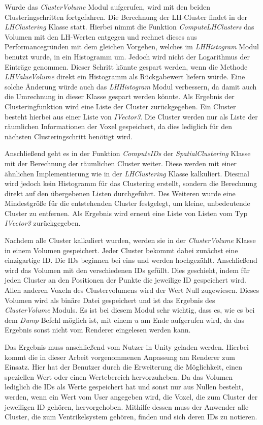 Wurde das \textit{ClusterVolume} Modul aufgerufen, wird mit den beiden Clusteringschritten fortgefahren. Die Berechnung der LH-Cluster findet in der \textit{LHClustering} Klasse statt. Hierbei nimmt die Funktion \textit{ComputeLHClusters} das Volumen mit den LH-Werten entgegen und rechnet dieses aus Performancegründen mit dem gleichen Vorgehen, welches im \textit{LHHistogram} Modul benutzt wurde, in ein Histogramm um. Jedoch wird nicht der Logarithmus der Einträge genommen. Dieser Schritt könnte gespart werden, wenn die Methode \textit{LHValueVolume} direkt ein Histogramm als Rückgabewert liefern würde. Eine solche Änderung würde auch das \textit{LHHistogram} Modul verbessern, da damit auch die Umrechnung in dieser Klasse gespart werden könnte.
\newline
Als Ergebnis der Clusteringfunktion wird eine Liste der Cluster zurückgegeben. Ein Cluster besteht hierbei aus einer Liste von \textit{IVector3}. Die Cluster werden nur als Liste der räumlichen Informationen der Voxel gespeichert, da dies lediglich für den nächsten Clusteringschritt benötigt wird. 


Anschließend geht es in der Funktion \textit{ComputeIDs} der \textit{SpatialClustering} Klasse mit der Berechnung der räumlichen Cluster weiter. Diese werden mit einer ähnlichen Implementierung wie in der \textit{LHClustering} Klasse kalkuliert. Diesmal wird jedoch kein Histogramm für das Clustering erstellt, sondern die Berechnung direkt auf den übergebenen Listen durchgeführt. Des Weiteren wurde eine Mindestgröße für die entstehenden Cluster festgelegt, um kleine, unbedeutende Cluster zu entfernen. Als Ergebnis wird erneut eine Liste von Listen vom Typ \textit{IVector3} zurückgegeben.


Nachdem alle Cluster kalkuliert wurden, werden sie in der \textit{ClusterVolume} Klasse in einem Volumen gespeichert. Jeder Cluster bekommt dabei zunächst eine einzigartige ID. Die IDs beginnen bei eins und werden hochgezählt. Anschließend wird das Volumen mit den verschiedenen IDs gefüllt. Dies geschieht, indem für jeden Cluster an den Positionen der Punkte die jeweilige ID gespeichert wird. Allen anderen Voxeln des Clustervolumens wird der Wert Null zugewiesen.
Dieses Volumen wird als binäre Datei gespeichert und ist das Ergebnis des \textit{ClusterVolume} Moduls. Es ist bei diesem Modul sehr wichtig, dass es, wie es bei dem \textit{Dump} Befehl möglich ist, mit einem $u$ am Ende aufgerufen wird, da das Ergebnis sonst nicht vom Renderer eingelesen werden kann.


Das Ergebnis muss anschließend vom Nutzer in Unity geladen werden. Hierbei kommt die in dieser Arbeit vorgenommenen Anpassung am Renderer zum Einsatz.
Hier hat der Benutzer durch die Erweiterung die Möglichkeit, einen speziellen Wert oder einen Wertebereich hervorzuheben. Da das Volumen lediglich die IDs als Werte gespeichert hat und sonst nur aus Nullen besteht, werden, wenn ein Wert vom User angegeben wird, die Voxel, die zum Cluster der jeweiligen ID gehören, hervorgehoben.
Mithilfe dessen muss der Anwender alle Cluster, die zum Ventrikelsystem gehören, finden und sich deren IDs zu notieren.


